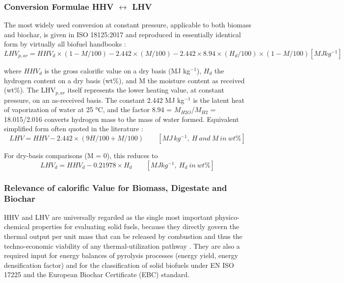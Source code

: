 \subsubsection*{Conversion Formulae HHV $\leftrightarrow$ LHV}
The most widely used conversion at constant pressure, applicable to both biomass and biochar, is given in ISO 18125:2017 \cite{iso18125_2017} and reproduced in essentially identical form by virtually all biofuel handbooks \cite{van-loo-2008,basu-2018}:
\[
LHV_{p,ar} = HHV_d \times (1 - M/100) - 2.442 \times (M/100) - 2.442 \times 8.94 \times (H_d/100) \times (1 - M/100)        [MJ kg^{-1}]
\]

where $HHV_d$ is the gross calorific value on a dry basis (MJ kg$^{-1}$), $H_d$ the hydrogen content on a dry basis (wt\%), and M the moisture content as received (wt\%). The LHV$_{p,ar}$ itself represents the lower heating value, at constant pressure, on an as-received basis. The constant 2.442 MJ kg$^{-1}$ is the latent heat of vaporization of water at 25 °C, and the factor 8.94 = $M_{H2O}$/$M_{H2}$ = 18.015/2.016 converts hydrogen mass to the mass of water formed.
Equivalent simplified form often quoted in the literature \cite{sheng-2005}:
\[
LHV = HHV - 2.442 \times (9 H/100 + M/100) \qquad [MJ\, kg^{-1},\:H\: and\: M\: in\: wt\%]
\]

For dry-basis comparisons (M = 0), this reduces to 
\[
LHV_d = HHV_d - 0.21978 \times H_d \qquad [MJ kg^{-1},\: H_d\: in\: wt\% ]
\]

\subsubsection{Relevance of calorific Value for Biomass, Digestate and Biochar}
HHV and LHV are universally regarded as the single most important physico-chemical properties for evaluating solid fuels, because they directly govern the thermal output per unit mass that can be released by combustion and thus the techno-economic viability of any thermal-utilization pathway \cite{van-loo-2008,basu-2018,Lehmann2015}. They are also a required input for energy balances of pyrolysis processes (energy yield, energy densification factor) and for the classification of solid biofuels under EN ISO 17225 and the European Biochar Certificate (EBC) standard.

